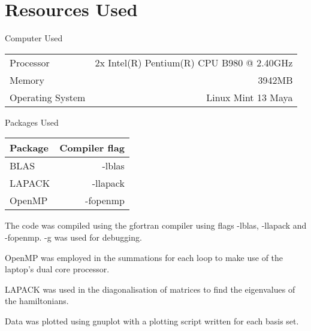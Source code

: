 
\chapter{Resources Used} %

\label{AppendixA} %


Computer Used

\begin{tabular}{l | r
}
\hline
Processor	     & 2x Intel(R) Pentium(R) CPU B980 @ 2.40GHz \\
Memory	         & 3942MB                                    \\
Operating System & Linux Mint 13 Maya                        \\
\hline
\end{tabular}

Packages Used

\begin{tabular}{l | r
}
\hline
Package          & Compiler flag            \\
\hline
BLAS	         & -lblas                   \\
LAPACK	         & -llapack                 \\
OpenMP           & -fopenmp                 \\
\hline
\end{tabular}

The code was compiled using the gfortran compiler using flags -lblas, -llapack and -fopenmp. -g was used for debugging.

OpenMP was employed in the summations for each loop to make use of the laptop's dual core processor.

LAPACK was used in the diagonalisation of matrices to find the eigenvalues of the hamiltonians. 

Data was plotted using gnuplot with a plotting script written for each basis set. 


